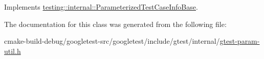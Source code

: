 Implements \mbox{\hyperlink{classtesting_1_1internal_1_1ParameterizedTestCaseInfoBase_a92baca6c64c822c2e7043217f7903ef2}{testing\+::internal\+::\+Parameterized\+Test\+Case\+Info\+Base}}.



The documentation for this class was generated from the following file\+:\begin{DoxyCompactItemize}
\item 
cmake-\/build-\/debug/googletest-\/src/googletest/include/gtest/internal/\mbox{\hyperlink{gtest-param-util_8h}{gtest-\/param-\/util.\+h}}\end{DoxyCompactItemize}
